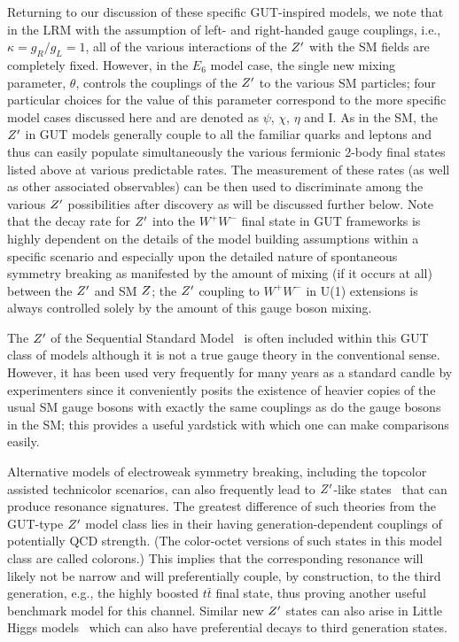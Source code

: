 \documentclass[a4paper,11pt]{article}
\begin{document}
Returning to our discussion of these specific GUT-inspired models, we note that in the LRM with the assumption of left- and right-handed gauge couplings, i.e., $\kappa=g_R/g_L=1$,
all of the various interactions of the $Z^{\prime}$ with the SM fields are completely fixed. However, in the $E_6$ model case, the
single new mixing parameter, $\theta$, controls the couplings of the $Z^{\prime}$ to the various SM particles; four particular choices for the value of this parameter correspond to the more
specific model cases discussed here and are denoted as $\psi$, $\chi$, $\eta$ and I. As in the SM, the $Z^{\prime}$ in GUT models generally couple to all the familiar quarks and leptons and
thus can easily populate simultaneously the various fermionic 2-body final states listed above at various predictable rates. The measurement of these rates (as well as other associated
observables) can be then used to discriminate among the various $Z^{\prime}$ possibilities after discovery as will be discussed further below. Note that the decay rate for $Z^{\prime}$ into the
$W^+W^-$ final state in GUT frameworks is highly dependent on the details of the model building assumptions within a specific scenario and especially upon the detailed nature
of spontaneous symmetry breaking as manifested by the amount of mixing (if it occurs at all) between the $Z^{\prime}$ and SM $Z$; the $Z^{\prime}$ coupling to $W^+W^-$ in U(1) extensions is
always controlled solely by the amount of this gauge boson mixing.

The $Z^{\prime}$ of the Sequential Standard Model~\cite{Altarelli:1989ff} is often included within this GUT class of models although it is not a true gauge theory in the conventional sense.
However, it has been used very frequently for many years as a standard candle by experimenters since it conveniently posits the existence of heavier copies of the usual SM gauge bosons
with exactly the same couplings as do the gauge bosons in the SM; this provides a useful yardstick with which one can make comparisons easily.

Alternative models of electroweak symmetry breaking, including the topcolor assisted technicolor scenarios, can also frequently lead to $Z^{\prime}$-like states~\cite{Hill:1994hp}
that can produce resonance signatures. The greatest difference of such theories from the GUT-type $Z^{\prime}$ model class lies in their having generation-dependent couplings of
potentially QCD strength. (The color-octet versions of such states in this model class are called colorons.) This implies that the corresponding resonance will likely not be narrow and
will preferentially couple, by construction, to the
third generation, e.g., the highly boosted $t\bar t$ final state, thus proving another useful benchmark model for this channel. Similar new $Z^{\prime}$ states can also arise in Little Higgs
models~\cite{ArkaniHamed:2001nc} which can also have preferential decays to third generation states.
\end{document}
